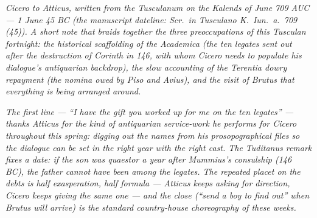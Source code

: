 
\textit{Cicero to Atticus, written from the Tusculanum
on the Kalends of June 709 AUC --- 1 June 45 BC (the
manuscript dateline: \textit{Scr.\ in Tusculano K.\
Iun.\ a.\ 709 (45)}). A short note that braids
together the three preoccupations of this Tusculan
fortnight: the historical scaffolding of the
\textit{Academica} (the ten legates sent out after
the destruction of Corinth in 146, with whom
Cicero needs to populate his dialogue's antiquarian
backdrop), the slow accounting of the Terentia
dowry repayment (the \textit{nomina} owed by Piso
and Avius), and the visit of Brutus that everything
is being arranged around.}

\textit{The first line --- ``I have the gift you
worked up for me on the ten legates'' --- thanks
Atticus for the kind of antiquarian service-work he
performs for Cicero throughout this spring: digging
out the names from his prosopographical files so
the dialogue can be set in the right year with the
right cast. The Tuditanus remark fixes a date: if
the son was quaestor a year after Mummius's
consulship (146 BC), the father cannot have been
among the legates. The repeated \textit{placet}
on the debts is half exasperation, half formula
--- Atticus keeps asking for direction, Cicero
keeps giving the same one --- and the close
(``send a boy to find out'' when Brutus will
arrive) is the standard country-house
choreography of these weeks.}
